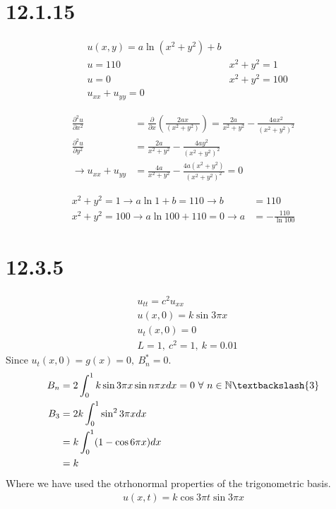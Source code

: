 \documentclass[11pt,a4paper]{article}
\begin{document}
\section*{12.1.15}
\begin{align*}
    & u(x, y) = a \ln (x^2+y^2) + b \\
    & u = 110 & x^2+y^2 = 1 \\
    & u = 0 & x^2+y^2 = 100 \\
    & u_{xx} + u_{yy} = 0
\end{align*}

\begin{align*}
    \frac{\partial^2 u}{\partial x^2}
    &= \frac{\partial}{\partial x} \left(\frac{2ax}{(x^2+y^2)}\right)
    = \frac{2a}{x^2+y^2} - \frac{4ax^2}{(x^2+y^2)^2} \\
    \frac{\partial^2 u}{\partial y^2} &= \frac{2a}{x^2+y^2} - \frac{4ay^2}{(x^2+y^2)^2} \\
    \rightarrow u_{xx} + u_{yy}  &= \frac{4a}{x^2+y^2} - \frac{4a(x^2+y^2)}{(x^2+y^2)^2} = 0
\end{align*}

\begin{align*}
    x^2+y^2 = 1 \rightarrow a \ln 1 + b = 110 \rightarrow b &= 110 \\
    x^2+y^2 = 100 \rightarrow a \ln 100 + 110 = 0 \rightarrow a &= - \frac{110}{\ln 100}
\end{align*}

\newpage

\section*{12.3.5}
\begin{align*}
    & u_{tt} = c^2 u_{xx} \\
    & u(x, 0) = k \sin 3\pi x \\
    & u_t (x, 0) = 0 \\
    & L = 1,\ c^2 = 1,\ k = 0.01
\end{align*}
Since $u_t(x,0) = g(x) = 0,\ B_n^* = 0$.
\begin{align*}
    B_n &= 2 \int_0^1 k \sin 3\pi x \sin n\pi x dx = 0\ \forall\ n \in \mathbb{N}\textbackslash\{3\} \\
    B_3 &= 2k\int_0^1 \sin^2 3\pi x dx \\
    &= k\int_0^1 (1-\cos 6\pi x) dx \\
    &= k
\end{align*}
Where we have used the otrhonormal properties of the trigonometric basis.
\begin{align*}
    u(x, t) = k \cos 3\pi t \sin 3\pi x
\end{align*}
\end{document}
